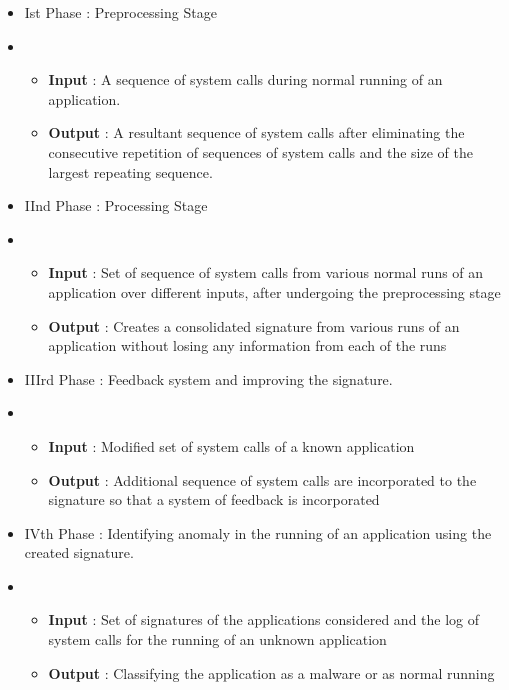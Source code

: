 \begin{itemize}
    \item[] Ist Phase : Preprocessing Stage
    \item[] \begin{itemize}
                \item[] \textbf{Input}    : A sequence of system calls during normal running of an application. 
                \item[] \textbf{Output} : A resultant sequence of system calls after eliminating the consecutive repetition of sequences of system calls and the size of the largest repeating sequence.
            \end{itemize}
    \item[] IInd Phase : Processing Stage
    \item[] \begin{itemize}
                \item[] \textbf{Input}    : Set of sequence of system calls from various normal runs of an application over different inputs, after undergoing the preprocessing stage
                \item[] \textbf{Output} : Creates a consolidated signature from various runs of an application without losing any information from each of the runs
            \end{itemize}

    \item[] IIIrd Phase : Feedback system and improving the signature.
    \item[] \begin{itemize}
                \item[] \textbf{Input}    : Modified set of system calls of a known application
                \item[] \textbf{Output} : Additional sequence of system calls are incorporated to the signature so that a system of feedback is incorporated
            \end{itemize}

    \item[] IVth Phase : Identifying anomaly in the running of an application using the created signature.
    \item[] \begin{itemize}
                \item[] \textbf{Input} : Set of signatures of the applications considered and the log of system calls for the running of an unknown application
                \item[] \textbf{Output} : Classifying the application as a malware or as normal running
            \end{itemize}
\end{itemize}
